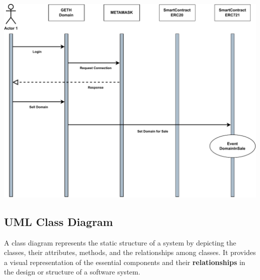 \documentclass[main.tex]{subfiles}
\begin{document}
\includegraphics[width=0.8\linewidth]{figures/InSaleDomain.drawio.pdf}\\




\newpage
\subsection{UML Class Diagram}
A class diagram represents the static structure of a system by depicting the classes, their attributes, methods, and the relationships among classes. It provides a visual representation of the essential components and their \textbf{relationships} in the design or structure of a software system.
\end{document}
